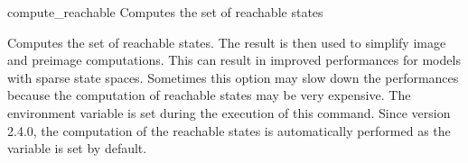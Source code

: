 \begin{nusmvCommand}{compute\_reachable} {Computes the set of reachable states}


Computes the set of reachable states. The result is then used to
simplify image and preimage computations. This can result in improved
performances for models with sparse state spaces. Sometimes this
option may slow down the performances because the computation of
reachable states may be very expensive. The environment variable
 is set during the execution of this
command. Since version 2.4.0, the computation of the reachable states
is automatically performed as the variable  is
set by default.

\end{nusmvCommand}
